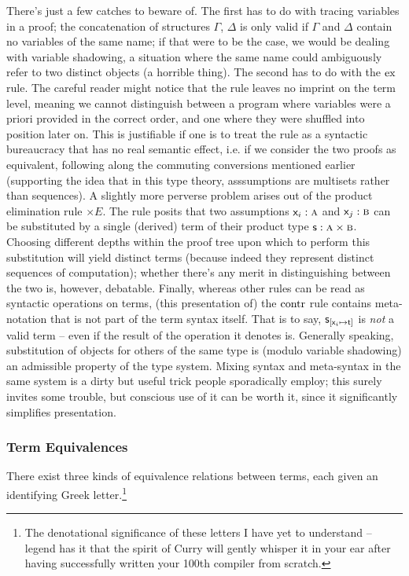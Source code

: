 There's just a few catches to beware of.
The first has to do with tracing variables in a proof; the concatenation of structures $\Gamma$, $\Delta$ is only valid if $\Gamma$ and $\Delta$ contain no variables of the same name; if that were to be the case, we would be dealing with variable shadowing, a situation where the same name could ambiguously refer to two distinct objects (a horrible thing).
The second has to do with the $\mathrm{ex}{}$ rule. 
The careful reader might notice that the rule leaves no imprint on the term level, meaning we cannot distinguish between a program where variables were a priori provided in the correct order, and one where they were shuffled into position later on.
This is justifiable if one is to treat the rule as a syntactic bureaucracy that has no real semantic effect, i.e. if we consider the two proofs as equivalent, following along the commuting conversions mentioned earlier (supporting the idea that in this type theory, asssumptions are multisets rather than sequences).
A slightly more perverse problem arises out of the product elimination rule $\times E$.
The rule posits that two assumptions $\mathsf{\mathsf{x}_{\mathnormal{i}} }: \normalfont\textsc{a}$ and $\mathsf{\mathsf{x}_{\mathnormal{j}}}: \normalfont\textsc{b}$ can be substituted by a single (derived) term of their product type $\mathsf{s}: \normalfont\textsc{a}\times\normalfont\textsc{b}$. 
Choosing different depths within the proof tree upon which to perform this substitution will yield distinct terms (because indeed they represent distinct sequences of computation); whether there's any merit in distinguishing between the two is, however, debatable.
Finally, whereas other rules can be read as syntactic operations on terms, (this presentation of) the $\mathrm{contr}{}$ rule contains meta-notation that is not part of the term syntax itself.
That is to say, $\mathsf{s}_{[\mathsf{\mathsf{x}_{\mathnormal{i}} } \mapsto \mathsf{t}]}$ is \textit{not} a valid term -- even if the result of the operation it denotes is.
Generally speaking, substitution of objects for others of the same type is (modulo variable shadowing) an admissible property of the type system.
Mixing syntax and meta-syntax in the same system is a dirty but useful trick people sporadically employ; this surely invites some trouble, but conscious use of it can be worth it, since it significantly simplifies presentation.

\subsubsection{Term Equivalences}
There exist three kinds of equivalence relations between terms, each given an identifying Greek letter.\footnote{The denotational significance of these letters I have yet to understand -- legend has it that the spirit of Curry will gently whisper it in your ear after having successfully written your 100th compiler from scratch.}

